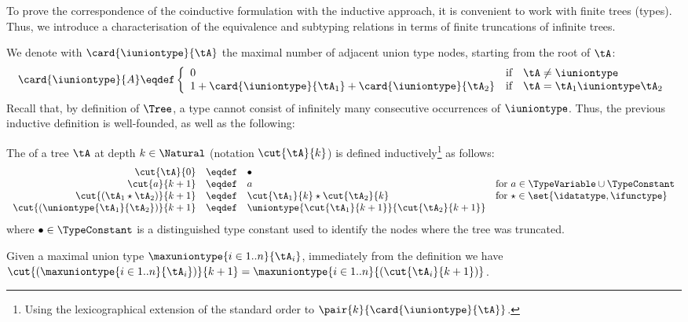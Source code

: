 To prove the correspondence of the coinductive formulation with the inductive
approach, it is convenient to work with finite trees (types). Thus, we
introduce a characterisation of the equivalence and subtyping relations in
terms of finite truncations of infinite trees.

We denote with $\card{\iuniontype}{\tA}$ the maximal number of adjacent union
type nodes, starting from the root of $\tA$: $$
\card{\iuniontype}{A} \eqdef \left\{
\begin{array}{l@{\quad\text{if}\quad}l}
0                                                         & \tA \neq \iuniontype \\
1 + \card{\iuniontype}{\tA_1} + \card{\iuniontype}{\tA_2} & \tA = \tA_1 \iuniontype \tA_2
\end{array}\right.
$$ Recall that, by definition of $\Tree$, a type cannot consist of infinitely
many consecutive occurrences of $\iuniontype$. Thus, the previous inductive
definition is well-founded, as well as the following:

\begin{definition}
\label{def:treeCut}
The  of a tree $\tA$ at depth $k \in \Natural$ (notation
$\cut{\tA}{k}$) is defined inductively\footnote{Using the lexicographical
extension of the standard order to $\pair{k}{\card{\iuniontype}{\tA}}$.} as
follows: $$
\begin{array}{r@{\quad\eqdef\quad}l@{\quad}l}
\cut{\tA}{0}                          & \bullet \\
\cut{a}{k+1}                          & a                                   & \text{for $a \in \TypeVariable \cup \TypeConstant$} \\
\cut{(\tA_1 \star \tA_2)}{k+1}        & \cut{\tA_1}{k} \star \cut{\tA_2}{k} & \text{for $\star \in \set{\idatatype, \ifunctype}$} \\
\cut{(\uniontype{\tA_1}{\tA_2})}{k+1} & \uniontype{\cut{\tA_1}{k+1}}{\cut{\tA_2}{k+1}}
\end{array} $$ where $\bullet \in \TypeConstant$ is a distinguished type
constant used to identify the nodes where the tree was truncated.
\end{definition}

\begin{remark}
\label{rem:cutMaximalUnionTypes}
Given a maximal union type $\maxuniontype{i \in 1..n}{\tA_i}$, immediately from
the definition we have $\cut{(\maxuniontype{i \in 1..n}{\tA_i})}{k+1} =
\maxuniontype{i \in 1..n}{(\cut{\tA_i}{k+1})}$.
\end{remark}



